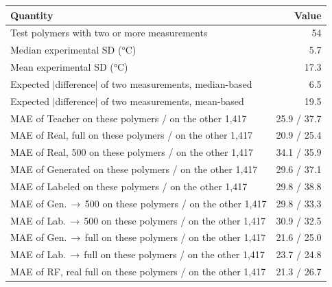 \begin{tabular}{@{}lr@{}}
\toprule
Quantity & Value \\
\midrule
Test polymers with two or more measurements & 54 \\
Median experimental SD (\unit{\celsius}) & 5.7 \\
Mean experimental SD (\unit{\celsius}) & 17.3 \\
Expected $|$difference$|$ of two measurements, median-based & 6.5 \\
Expected $|$difference$|$ of two measurements, mean-based & 19.5 \\
\midrule
MAE of Teacher on these polymers / on the other 1,417 & 25.9 / 37.7 \\
MAE of Real, full on these polymers / on the other 1,417 & 20.9 / 25.4 \\
MAE of Real, 500 on these polymers / on the other 1,417 & 34.1 / 35.9 \\
MAE of Generated on these polymers / on the other 1,417 & 29.6 / 37.1 \\
MAE of Labeled on these polymers / on the other 1,417 & 29.8 / 38.8 \\
MAE of Gen.\,$\rightarrow$\,500 on these polymers / on the other 1,417 & 29.8 / 33.3 \\
MAE of Lab.\,$\rightarrow$\,500 on these polymers / on the other 1,417 & 30.9 / 32.5 \\
MAE of Gen.\,$\rightarrow$\,full on these polymers / on the other 1,417 & 21.6 / 25.0 \\
MAE of Lab.\,$\rightarrow$\,full on these polymers / on the other 1,417 & 23.7 / 24.8 \\
MAE of RF, real full on these polymers / on the other 1,417 & 21.3 / 26.7 \\
\bottomrule
\end{tabular}
